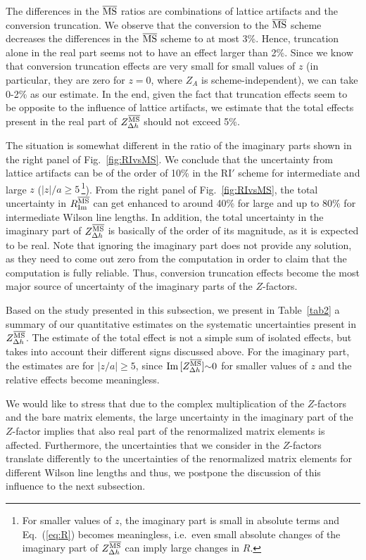 The differences in the ${\overline{\rm MS}}$ ratios are combinations of lattice artifacts and the conversion truncation.
We observe that the conversion to the ${\overline{\rm MS}}$ scheme decreases the differences in the ${\overline{\rm MS}}$ scheme to at most 3\%.
Hence, truncation alone in the real part seems not to have an effect larger than 2\%. Since we know that conversion
truncation effects are very small for small values of $z$ (in particular, they are zero for $z{=}0$, where $Z_A$
is scheme-independent), we can take 0-2\% as our estimate. In the end, given the fact that truncation
effects seem to be opposite to the influence of lattice artifacts, we estimate that the total effects present in the
real part of $Z_{\Delta h}^{\overline{\rm MS}}$ should not exceed 5\%.

The situation is somewhat different in the ratio of the imaginary parts shown in the right panel of Fig.~\ref{fig:RIvsMS}.
We conclude that the uncertainty from lattice artifacts can be of the order of 10\% in the RI$'$ scheme for intermediate
and large $z$ ($|z|/a\geq5$\,\footnote{For smaller values of $z$, the imaginary part is small in absolute terms and
Eq.~(\ref{eq:R})  becomes meaningless, i.e.\ even small absolute changes of the imaginary part of $Z_{\Delta h}^{\overline{\rm MS}}$
can imply large changes in $R$.}). From the right panel of Fig.~\ref{fig:RIvsMS}, the total uncertainty in
$R_{\rm Im}^{\overline{\rm MS}}$ can get enhanced to around 40\% for large and up to 80\% for intermediate Wilson line lengths.
In addition, the total uncertainty in the imaginary part of $Z_{\Delta h}^{\overline{\rm MS}}$ is basically of the order of its magnitude,
as it is expected to be real. Note that ignoring the imaginary part does not provide any solution, as
 they need to come out zero from the computation in order to claim that the computation is fully reliable.
Thus, conversion truncation effects become the most major source of uncertainty of the imaginary parts of the $Z$-factors.

\bigskip
Based on the study presented in this subsection, we present in Table~\ref{tab2} a summary of our quantitative estimates on
the systematic uncertainties present in $Z_{\Delta h}^{\overline{\rm MS}}$. The estimate of the total effect is not a simple sum of
isolated effects, but takes into account their different signs discussed above. For the imaginary part, the estimates are for
$|z/a|\geq5$, since ${\rm Im}\,[Z_{\Delta h}^{\overline{\rm MS}}]{\sim}0$ for smaller values of $z$ and the relative effects become meaningless.

We would like to stress that due to the complex multiplication of the $Z$-factors and the bare matrix elements,
the large uncertainty in the imaginary part of the $Z$-factor implies that also real part of the renormalized matrix
elements is affected. Furthermore, the uncertainties that we consider in the $Z$-factors translate differently to the
uncertainties of the renormalized matrix elements for different Wilson line lengths and thus, we postpone the discussion of this
influence to the next subsection.

